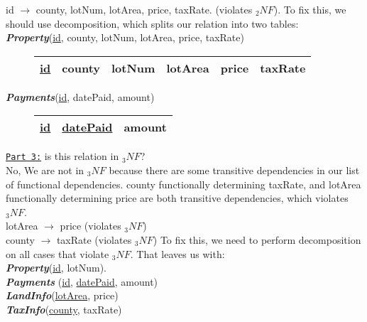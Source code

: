 \documentclass[letterpaper, 11pt]{article}
\newcommand{\1}{\mathds{1}}	%
\theoremstyle{definition}
\begin{document}
id $\rightarrow$ county, lotNum, lotArea, price, taxRate. (violates $_2NF$).
\bigbreak \noindent
To fix this, we should use decomposition, which splits our relation into two tables: \\
\textit{\textbf{Property}}(\underline{id}, county, lotNum, lotArea, price, taxRate)
    \begin{figure}[H]
    \centering
    \begin{tabular}{l l l l l l}
   \hline 
        \underline{id}& county& lotNum& lotArea& price& taxRate \\
        \hline
    \end{tabular}
    \end{figure}
    \noindent \textit{\textbf{Payments}}(\underline{id}, datePaid, amount)
        \begin{figure}[H]
        \centering
         \setlength{\tabcolsep}{45}
        \begin{tabular}{l l l}
            \hline
            \underline{id} & \underline{datePaid}&amount \\
        \hline
        \end{tabular}
        \end{figure}


        \newpage \noindent
\underline{\texttt{Part 3:}} is this relation in $_3NF$? \\
No, We are not in $_3NF$ because there are some transitive dependencies in our list of functional dependencies. county functionally determining taxRate, and lotArea functionally determining price are both transitive dependencies, which violates $_3NF$. \vspace{1mm} \\
lotArea $\rightarrow$ price (violates $_3NF$) \\
county $\rightarrow$ taxRate (violates $_3NF$)
\bigbreak \noindent
To fix this, we need to perform decomposition on all cases that violate $_3NF$. That leaves us with: \vspace{1mm}\\
\textit{\textbf{Property}}(\underline{id}, lotNum). \\
\noindent \textit{\textbf{Payments} }(\underline{id}, \underline{datePaid}, amount) \\
\textit{\textbf{LandInfo}}(\underline{lotArea}, price) \\ 
\textit{\textbf{TaxInfo}}(\underline{county}, taxRate)
\end{document}
